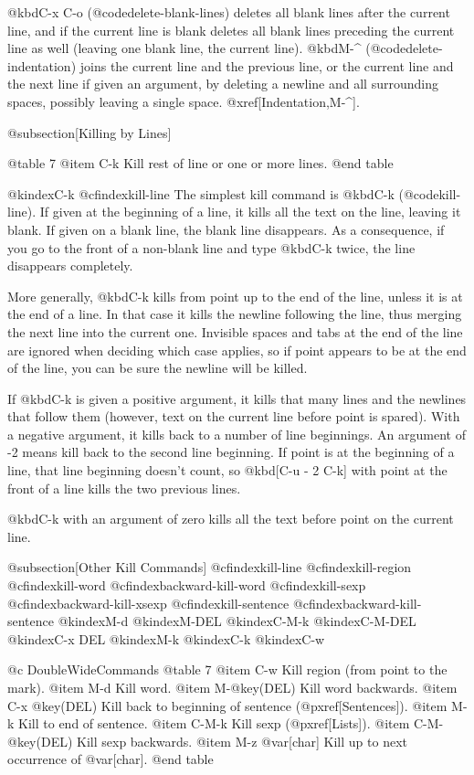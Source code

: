 {{{{{{  @kbd{C-x C-o} (@code{delete-blank-lines}) deletes all blank lines
after the current line, and if the current line is blank deletes all
blank lines preceding the current line as well (leaving one blank
line, the current line).  @kbd{M-^} (@code{delete-indentation}) joins
the current line and the previous line, or the current line and the
next line if given an argument, by deleting a newline and all
surrounding spaces, possibly leaving a single space.
@xref[Indentation,M-^].

@subsection[Killing by Lines]

@table 7
@item C-k
Kill rest of line or one or more lines.
@end table

@kindex{C-k}
@cfindex{kill-line}
  The simplest kill command is @kbd{C-k} (@code{kill-line}).  If given at
the beginning of a line, it kills all the text on the line, leaving it
blank.  If given on a blank line, the blank line disappears.  As a
consequence, if you go to the front of a non-blank line and type
@kbd{C-k} twice, the line disappears completely.

  More generally, @kbd{C-k} kills from point up to the end of the line,
unless it is at the end of a line.  In that case it kills the newline
following the line, thus merging the next line into the current one.
Invisible spaces and tabs at the end of the line are ignored when deciding
which case applies, so if point appears to be at the end of the line, you
can be sure the newline will be killed.

  If @kbd{C-k} is given a positive argument, it kills that many lines and
the newlines that follow them (however, text on the current line before
point is spared).  With a negative argument, it kills back to a number of
line beginnings.  An argument of -2 means kill back to the second line
beginning.  If point is at the beginning of a line, that line beginning
doesn't count, so @kbd[C-u - 2 C-k] with point at the front of a line kills
the two previous lines.

  @kbd{C-k} with an argument of zero kills all the text before point on the
current line.

@subsection[Other Kill Commands]
@cfindex{kill-line}
@cfindex{kill-region}
@cfindex{kill-word}
@cfindex{backward-kill-word}
@cfindex{kill-sexp}
@cfindex{backward-kill-xsexp}
@cfindex{kill-sentence}
@cfindex{backward-kill-sentence}
@kindex{M-d}
@kindex{M-DEL}
@kindex{C-M-k}
@kindex{C-M-DEL}
@kindex{C-x DEL}
@kindex{M-k}
@kindex{C-k}
@kindex{C-w}

@c DoubleWideCommands
@table 7
@item C-w
Kill region (from point to the mark).
@item M-d
Kill word.
@item M-@key(DEL)
Kill word backwards.
@item C-x @key(DEL)
Kill back to beginning of sentence (@pxref[Sentences]).
@item M-k
Kill to end of sentence.
@item C-M-k
Kill sexp (@pxref[Lists]).
@item C-M-@key(DEL)
Kill sexp backwards.
@item M-z @var[char]
Kill up to next occurrence of @var[char].
@end table

}}}}}}
